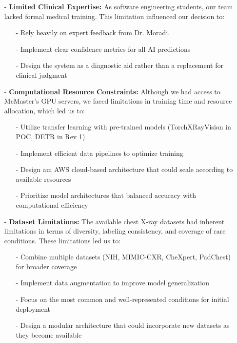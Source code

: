 \documentclass{article}
\begin{document}
\begin{itemize}
    \item[-] \textbf{Limited Clinical Expertise:} As software engineering students, our team lacked formal medical training. This limitation influenced our decision to:
    \begin{itemize}
        \item[-] Rely heavily on expert feedback from Dr. Moradi.
        \item[-] Implement clear confidence metrics for all AI predictions
        \item[-] Design the system as a diagnostic aid rather than a replacement for clinical judgment
    \end{itemize}
    
    \item[-] \textbf{Computational Resource Constraints:} Although we had access to McMaster's GPU servers, we faced limitations in training time and resource allocation, which led us to:
    \begin{itemize}
        \item[-] Utilize transfer learning with pre-trained models (TorchXRayVision in POC, DETR in Rev 1)
        \item[-] Implement efficient data pipelines to optimize training
        \item[-] Design am AWS cloud-based architecture that could scale according to available resources
        \item[-] Prioritize model architectures that balanced accuracy with computational efficiency
    \end{itemize}
    
    \item[-] \textbf{Dataset Limitations:} The available chest X-ray datasets had inherent limitations in terms of diversity, labeling consistency, and coverage of rare conditions. These limitations led us to:
    \begin{itemize}
        \item[-] Combine multiple datasets (NIH, MIMIC-CXR, CheXpert, PadChest) for broader coverage
        \item[-] Implement data augmentation to improve model generalization
        \item[-] Focus on the most common and well-represented conditions for initial deployment
        \item[-] Design a modular architecture that could incorporate new datasets as they become available
    \end{itemize}
\end{itemize}
\end{document}
